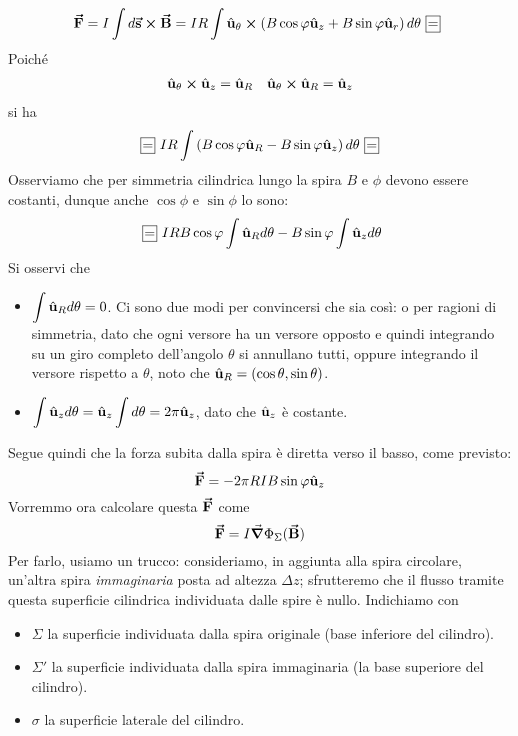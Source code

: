 \begin{equation*}
	\vba{F}=I\int d\vba{s}\cross\vba{B}=IR\int\vbh{u}_{\theta}\cross\left(B\cos\phi\vbh{u}_z+B\sin\phi\vbh{u}_r\right)d\theta\squarequal
\end{equation*}
Poiché
\begin{align*}
	\hat{\mathbf{u}}_{\theta}\cross\hat{\mathbf{u}}_{z}=\hat{\mathbf{u}}_R&&
	\hat{\mathbf{u}}_{\theta}\cross\hat{\mathbf{u}}_{R}=\hat{\mathbf{u}}_z
\end{align*}
si ha
\begin{equation*}
\squarequal IR\int \left(B\cos\phi\vbh{u}_R-B\sin\phi\vbh{u}_z\right)d\theta\squarequal
\end{equation*}
Osserviamo che per simmetria cilindrica lungo la spira $B$ e $\phi$ devono essere costanti, dunque anche $\cos\phi$ e $\sin\phi$ lo sono:
\begin{equation*}
\squarequal IRB\cos\phi\int \vbh{u}_Rd\theta-B\sin\phi\int\vbh{u}_zd\theta
\end{equation*}
Si osservi che
\begin{itemize}
	\item $\displaystyle\int\hat{\mathbf{u}}_Rd\theta=0$. Ci sono due modi per convincersi che sia così: o per ragioni di simmetria, dato che ogni versore ha un versore opposto e quindi integrando su un giro completo dell'angolo $\theta$ si annullano tutti, oppure integrando il versore rispetto a $\theta$, noto che $\hat{\mathbf{u}}_R=\left(\cos\theta,\sin\theta\right)$. 
	\item $\displaystyle\int\hat{\mathbf{u}}_zd\theta=\hat{\mathbf{u}}_z\int d\theta=2\pi\hat{\mathbf{u}}_z$, dato che $\hat{\mathbf{u}}_z$ è costante.
\end{itemize}
Segue quindi che la forza subita dalla spira è diretta verso il basso, come previsto:
\begin{equation}
	\vb*{\va{F}}=-2\pi R I B\sin\varphi\hat{\mathbf{u}}_z
\end{equation}
Vorremmo ora calcolare questa $\vb*{\va{F}}$ come
\begin{equation*}
	\vb*{\va{F}}=I\grad{\Phi_{\Sigma}(\vb*{\va{B}})}
\end{equation*}
Per farlo, usiamo un trucco: consideriamo, in aggiunta alla spira circolare, un'altra spira \textit{immaginaria} posta ad altezza $\Delta z$; sfrutteremo che il flusso tramite questa superficie cilindrica individuata dalle spire è nullo. Indichiamo con
\begin{itemize}
	\item $\Sigma$ la superficie individuata dalla spira originale (base inferiore del cilindro).
	\item $\Sigma'$ la superficie individuata dalla spira immaginaria (la base superiore del cilindro).
	\item $\sigma$ la superficie laterale del cilindro.
\end{itemize}
